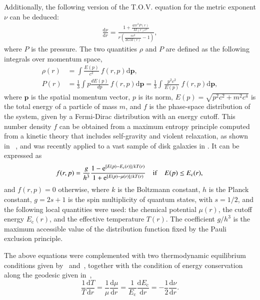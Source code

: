 \documentclass[twocolumn]{aa}
\begin{document}
Additionally, the following version of the T.O.V. equation for the metric exponent $\nu$ can be deduced:
\begin{align}
   \label{tov}
    \frac{\mathrm{d}\nu}{\mathrm{d}r}= \frac{1+ \frac{\displaystyle 4\pi r^3 P(r)}{\displaystyle M(r)c^2}}{r\left(\frac{\displaystyle rc^2}{\displaystyle 2GM(r)} -1\right)},
\end{align}
where $P$ is the pressure.
The two quantities $\rho$ and $P$ are defined as the following integrals over momentum space,
\begin{align}
     \label{dens_press}
      \rho(r)&=\int \frac{E(p)}{c^2}~f(r,p)\mathrm{d}\boldsymbol{p},\\
      P(r)&=\frac{1}{3}\int p\frac{dE(p)}{dp}~f(r,p)\mathrm{d}\boldsymbol{p}=
                \frac{1}{3}\int \frac{p^2c^2}{E(p)}~f(r,p)\mathrm{d}\boldsymbol{p},
\end{align}
where $\boldsymbol{p}$ is the spatial momentum  vector, $p$ is its norm, $E(p)=\sqrt{p^2c^2+m^2c^4}$ is the total energy of a particle of mass $m$, and $f$ is the phase-space distribution of the system, given by a Fermi-Dirac distribution with an energy cutoff. This number density $f$ can be obtained from a maximum entropy principle computed from a kinetic theory that includes self-gravity and violent relaxation, as shown in \citealp{2004PhyA..332...89C}~\citep[for a review see also][]{2022PhyA..60628089C}, and was recently applied to a vast sample of disk galaxies in \cite{2023ApJ...945....1K}. It can be expressed as
\begin{equation}
f(r,p)=
    \frac{g}{h^3}
      \frac{1-\mathrm{e}^{[E(p)-E_\mathrm{c}(r)]/kT(r)}}
      {1+\mathrm{e}^{[E(p)-\mu(r)]/kT(r)}}\quad\mathrm{if}\quad E(p) \leq E_\mathrm{c}(r),\\
\end{equation}
and $f(r,p)=0$ otherwise,
where $k$ is the Boltzmann constant, $h$ is the Planck constant, $g=2s+1$ is the spin multiplicity of quantum states, with $s=1/2$, and the following local quantities were used: the chemical potential $\mu(r)$, the cutoff energy $E_\mathrm{c}(r)$,  and the effective temperature $T(r)$.
The coefficient $g/h^3$ is the maximum accessible value of the distribution function fixed by the Pauli exclusion principle.

The above equations were complemented with two thermodynamic equilibrium conditions given
by~\citet{PhysRev.35.904} and~\citet{RevModPhys.21.531}, together with the condition of energy conservation
along the geodesic given in~\citet{1989A&A...221....4M},
\begin{equation}
    \label{tke}
   \frac{1}{T}\frac{\mathrm{d}T}{\mathrm{d}r}=\frac{1}{\mu}\frac{\mathrm{d}\mu}{\mathrm{d}r}=
   \frac{1}{E_\mathrm{c}}\frac{\mathrm{d} E_\mathrm{c}}{\mathrm{d}r}=-\frac{1}{2}\frac{\mathrm{d}\nu}{\mathrm{d}r}.
\end{equation}
\end{document}
